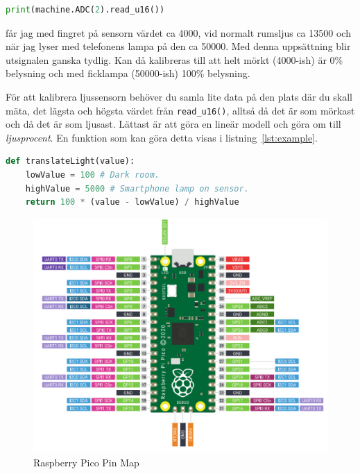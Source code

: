 \documentclass{article}
\begin{document}
\begin{lstlisting}[language=Python]
    print(machine.ADC(2).read_u16())
\end{lstlisting}
får jag med fingret på sensorn värdet ca 4000, vid normalt rumsljus ca 13500 och när jag lyser med telefonens lampa på den ca 50000. Med denna uppsättning blir utsignalen ganska tydlig. Kan då kalibreras till att helt mörkt (4000-ish) är 0\% belysning och med ficklampa (50000-ish) 100\% belysning. 

För att kalibrera ljussensorn behöver du samla lite data på den plats där du skall mäta, det lägsta och högsta värdet från \texttt{read\_u16()}, alltså då det är som mörkast och då det är som ljusast. Lättast är att göra en lineär modell och göra om till \emph{ljusprocent}. En funktion som kan göra detta visas i listning~\ref{lst:example}. 


\begin{lstlisting}[language=Python, caption={Kodsnutt med beskrivning av en funktion som omvandlar ADC-signal till ljusprocent. \texttt{lowValue} och \texttt{highValue} måste du bestämma själv genom att mäta med din Raspberry Pico och fotoresistor.}, label={lst:example}]
def translateLight(value):
    lowValue = 100 # Dark room.
    highValue = 5000 # Smartphone lamp on sensor.
    return 100 * (value - lowValue) / highValue
\end{lstlisting}


%




\begin{figure}[!h]
    \centering
    \includegraphics[width = \textwidth]{picopinout.png}
    \caption{Raspberry Pico Pin Map}
    \label{fig:Pico}
\end{figure}
\end{document}
